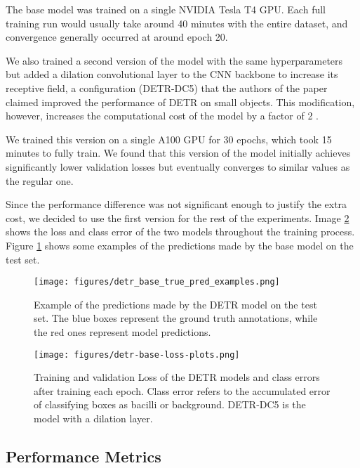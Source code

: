 \documentclass[../main.tex]{subfiles}
\begin{document}
The base model was trained on a single NVIDIA Tesla T4 GPU. Each full training run would usually take around 40 minutes with the entire dataset, and convergence generally occurred at around epoch 20.

We also trained a second version of the model with the same hyperparameters but added a dilation convolutional layer to the CNN backbone to increase its receptive field, a configuration (DETR-DC5) that the authors of the paper claimed improved the performance of DETR on small objects. This modification, however, increases the computational cost of the model by a factor of 2 \cite{carionEndtoEndObjectDetection2020}.

We trained this version on a single A100 GPU for 30 epochs, which took 15 minutes to fully train. We found that this version of the model initially achieves significantly lower validation losses but eventually converges to similar values as the regular one. 

Since the performance difference was not significant enough to justify the extra cost, we decided to use the first version for the rest of the experiments. Image \ref{fig:loss_plots_detr_base} shows the loss and class error of the two models throughout the training process. Figure \ref{fig:detr_base_true_pred_examples} shows some examples of the predictions made by the base model on the test set.

\begin{figure}[ht]
    \centering
    \texttt{[image: figures/detr\_base\_true\_pred\_examples.png]}
    \caption{Example of the predictions made by the DETR model on the test set. The blue boxes represent the ground truth annotations, while the red ones represent model predictions.}
    \label{fig:detr_base_true_pred_examples}
\end{figure}

\begin{figure}[ht]
    \centering
    \texttt{[image: figures/detr-base-loss-plots.png]}
    \caption{Training and validation Loss of the DETR models and class errors after training each epoch. \footnotesize Class error refers to the accumulated error of classifying boxes as bacilli or background. DETR-DC5 is the model with a dilation layer.}
    \label{fig:loss_plots_detr_base}
\end{figure}


    
    \subsection{Performance Metrics}
        
\end{document}
